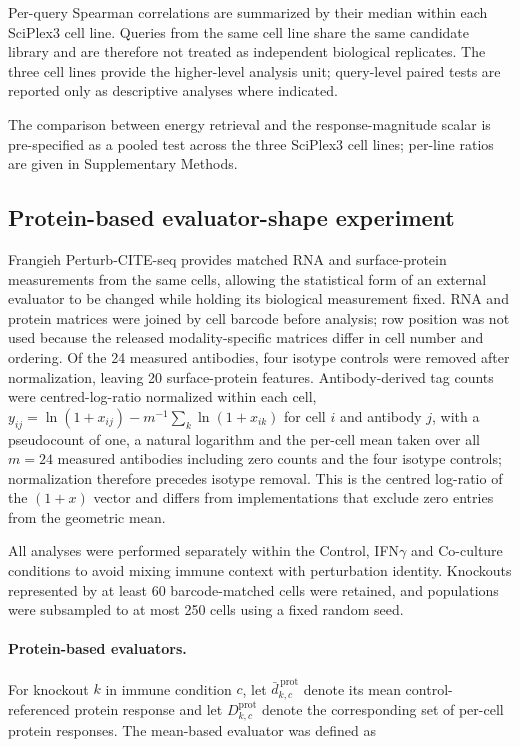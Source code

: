 \documentclass[11pt,letterpaper]{article}
\begin{document}
Per-query Spearman correlations are summarized by their median within each SciPlex3 cell line.
Queries from the same cell line share the same candidate library and are therefore not treated as
independent biological replicates. The three cell lines provide the higher-level analysis unit;
query-level paired tests are reported only as descriptive analyses where indicated.


The comparison between energy retrieval and the response-magnitude scalar is pre-specified as a
pooled test across the three SciPlex3 cell lines; per-line ratios are given in Supplementary
Methods.

\subsection*{Protein-based evaluator-shape experiment}

Frangieh Perturb-CITE-seq\cite{dataFrangieh} provides matched RNA and surface-protein measurements from the same
cells, allowing the statistical form of an external evaluator to be changed while holding its
biological measurement fixed. RNA and protein matrices were joined by cell barcode before
analysis; row position was not used because the released modality-specific matrices differ in
cell number and ordering. Of the 24 measured antibodies, four isotype controls were removed after normalization,
leaving 20 surface-protein features. Antibody-derived tag counts\cite{CITEseq} were centred-log-ratio normalized within each cell,
$y_{ij}=\ln(1+x_{ij})-m^{-1}\sum_{k}\ln(1+x_{ik})$ for cell $i$ and antibody $j$, with a
pseudocount of one, a natural logarithm and the per-cell mean taken over all $m=24$ measured
antibodies including zero counts and the four isotype controls; normalization therefore precedes
isotype removal. This is the centred log-ratio of the $(1+x)$ vector and differs from
implementations that exclude zero entries from the geometric mean.

All analyses were performed separately within the Control, IFN$\gamma$ and Co-culture conditions
to avoid mixing immune context with perturbation identity. Knockouts represented by at least
60 barcode-matched cells were retained, and populations were subsampled to at most 250 cells
using a fixed random seed.

\paragraph{Protein-based evaluators.}
For knockout $k$ in immune condition $c$, let
$\bar d^{\,\mathrm{prot}}_{k,c}$ denote its mean control-referenced protein response and let
$D^{\mathrm{prot}}_{k,c}$ denote the corresponding set of per-cell protein responses. The
mean-based evaluator was defined as
\end{document}

